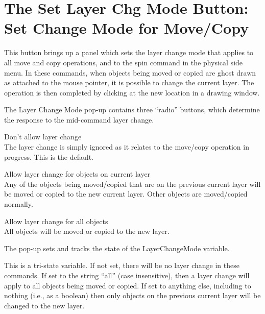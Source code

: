 \section{The {\cb Set Layer Chg Mode} Button: Set Change Mode for Move/Copy}
This button brings up a panel which sets the layer change mode that
applies to all move and copy operations, and to the {\cb spin} command
in the physical side menu.  In these commands, when objects being
moved or copied are ghost drawn as attached to the mouse pointer, it
is possible to change the current layer.  The operation is then
completed by clicking at the new location in a drawing window.
 
The {\cb Layer Change Mode} pop-up contains three ``radio'' buttons,
which determine the response to the mid-command layer change.

\begin{description}
\item{\cb Don't allow layer change}\\
The layer change is simply ignored as it relates to the move/copy
operation in progress.  This is the default.

\item{\cb Allow layer change for objects on current layer}\\
Any of the objects being moved/copied that are on the previous current
layer will be moved or copied to the new current layer.  Other objects
are moved/copied normally.

\item{\cb Allow layer change for all objects}\\
All objects will be moved or copied to the new layer.
\end{description}

The pop-up sets and tracks the state of the {\et LayerChangeMode}
variable.

This is a tri-state variable.  If not set, there will be no layer
change in these commands.  If set to the string ``{\vt all}'' (case
insensitive), then a layer change will apply to all objects being
moved or copied.  If set to anything else, including to nothing (i.e.,
as a boolean) then only objects on the previous current layer will be
changed to the new layer.

